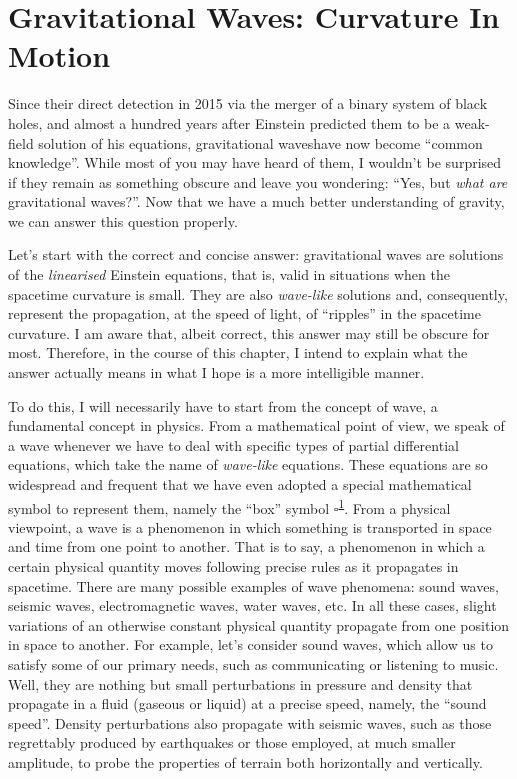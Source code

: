 \chapter{Gravitational Waves: Curvature In Motion}\label{ch:08}

Since their direct detection in 2015 via the merger of a binary system of black holes,
and almost a hundred years after Einstein predicted them to be a weak-field solution of
his equations, gravitational waveshave now become ``common
knowledge''. While most of you may have heard of them, I wouldn't be surprised if they
remain as something obscure and leave you wondering: ``Yes, but \emph{what are}
gravitational waves?''. Now that we have a much better understanding of gravity, we can
answer this question properly.

Let's start with the correct and concise answer: gravitational waves are solutions of
the \emph{linearised} Einstein equations, that is, valid in
situations when the spacetime curvature is small. They are also \emph{wave-like}
solutions and, consequently, represent the propagation, at the speed of light, of
``ripples'' in the spacetime curvature. I am aware that, albeit correct, this answer may
still be obscure for most. Therefore, in the course of this chapter, I intend to explain
what the answer actually means in what I hope is a more intelligible manner.

To do this, I will necessarily have to start from the concept of wave, a fundamental
concept in physics. From a mathematical point of view, we speak of a wave whenever we
have to deal with specific types of partial differential equations,
which take the name of \emph{wave-like} equations. These equations are so widespread and
frequent that we have even adopted a special mathematical symbol to represent them,
namely the ``box'' symbol \(\square\)\textsuperscript{\hyperlink{note:08-01}{1}}. From a physical viewpoint, a wave is a
phenomenon in which something is transported in space and time from one point to
another. That is to say, a phenomenon in which a certain physical quantity moves
following precise rules as it propagates in spacetime. There are many possible examples
of wave phenomena: sound waves, seismic waves,
electromagnetic waves, water waves, etc. In all
these cases, slight variations of an otherwise constant physical quantity propagate from
one position in space to another. For example, let's consider sound waves, which allow
us to satisfy some of our primary needs, such as communicating or listening to music.
Well, they are nothing but small perturbations in pressure and density that propagate in
a fluid (gaseous or liquid) at a precise speed, namely, the ``sound
speed''. Density perturbations also propagate with seismic waves, such as those
regrettably produced by earthquakes or those employed, at much smaller amplitude, to
probe the properties of terrain both horizontally and vertically.

